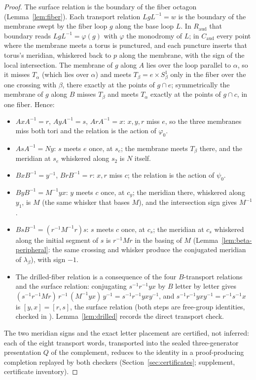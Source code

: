 \documentclass[11pt]{article}
\theoremstyle{definition}
\begin{document}
\begin{proof}
The surface relation is the boundary of the fiber octagon
(Lemma~\ref{lem:fiber}).  Each transport relation $LgL^{-1}=w$ is the
boundary of the membrane swept by the fiber loop $g$ along the base loop
$L$.  In $R_{\mathrm{aud}}$ that boundary reads $LgL^{-1}=\varphi(g)$ with
$\varphi$ the monodromy of $L$; in $C_{\mathrm{aud}}$ every point where the
membrane meets a torus is punctured, and each puncture inserts that torus's
meridian, whiskered back to $p$ along the membrane, with the sign of the
local intersection.  The membrane of $g$ along $A$ lies over the loop
parallel to $\alpha$, so it misses $T_\alpha$ (which lies over $\alpha$) and
meets $T_\beta=e\times S^1_\beta$ only in the fiber over the one crossing
with $\beta$, there exactly at the points of $g\cap e$; symmetrically the
membrane of $g$ along $B$ misses $T_\beta$ and meets $T_\alpha$ exactly at
the points of $g\cap c$, in one fiber.  Hence:
\begin{itemize}[leftmargin=1.6em,itemsep=1pt]
\item $AxA^{-1}=r$, $AyA^{-1}=s$, $ArA^{-1}=x$: $x,y,r$ miss $e$, so the
 three membranes miss both tori and the relation is the action of
 $\varphi_0$.
\item $AsA^{-1}=Ny$: $s$ meets $e$ once, at $s_e$; the membrane meets
 $T_\beta$ there, and the meridian at $s_e$ whiskered along $s_2$ is $N$
 itself.
\item $BxB^{-1}=y^{-1}$, $BrB^{-1}=r$: $x,r$ miss $c$; the relation is the
 action of $\psi_0$.
\item $ByB^{-1}=M^{-1}yx$: $y$ meets $c$ once, at $c_y$; the meridian
 there, whiskered along $y_1$, is $M$ (the same whisker that bases $M$), and
 the intersection sign gives $M^{-1}$.
\item $BsB^{-1}=(r^{-1}M^{-1}r)s$: $s$ meets $c$ once, at $c_s$; the
 meridian at $c_s$ whiskered along the initial segment of $s$ is
 $r^{-1}Mr$ in the basing of $M$ (Lemma~\ref{lem:beta-peripheral}: the same
 crossing and whisker produce the conjugated meridian of $\lambda_\beta$),
 with sign $-1$.
\item The drilled-fiber relation is a consequence of the four $B$-transport
 relations and the surface relation: conjugating $s^{-1}r^{-1}yx$ by $B$
 letter by letter gives
 $(s^{-1}r^{-1}Mr)\,r^{-1}\,(M^{-1}yx)\,y^{-1}=s^{-1}r^{-1}yxy^{-1}$, and
 $s^{-1}r^{-1}yxy^{-1}=r^{-1}s^{-1}x$ is $[y,x]=[r,s]$, the surface
 relation (both steps are free-group identities, checked in
 ).
 Lemma~\ref{lem:drilled} records the direct transport check.
\end{itemize}
The two meridian signs and the exact letter placement are certified, not
inferred: each of the eight transport words, transported into the sealed
three-generator presentation $Q$ of the complement, reduces to the identity
in a proof-producing completion replayed by both checkers (Section~\ref{sec:certificates};
supplement, certificate inventory).
\end{proof}
\end{document}
